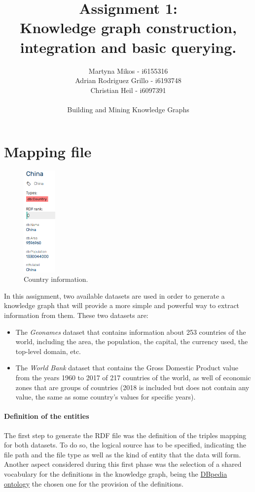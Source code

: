 \documentclass[11pt]{article}
\title{Assignment 1:\\ Knowledge graph construction, integration and basic querying.}
\author{Martyna Mikos - i6155316\\
Adrian Rodriguez Grillo - i6193748\\
Christian Heil - i6097391\\\\ Building and Mining Knowledge Graphs}
\begin{document}
\maketitle

\section{Mapping file}

\begin{figure}
  \centering
   \includegraphics[width=0.15\textwidth]{images/info_box.png}
  \caption{Country information.}
  \label{fig:country_info}
 \vspace{-10mm}
\end{figure}

In this assignment, two available datasets are used in order to generate a knowledge graph that will provide a more simple and powerful way to extract information from them. These two datasets are: 

\begin{itemize}
\item The \textit{Geonames} dataset that contains information about 253 countries of the world, including the area, the population, the capital, the currency used, the top-level domain, etc. 

\item The \textit{World Bank} dataset that contains the Gross Domestic Product value from the years 1960 to 2017 of 217 countries of the world, as well of economic zones that are groups of countries (2018 is included but does not contain any value, the same as some country's values for specific years). 
\end{itemize}

\paragraph{Definition of the entities}
The first step to generate the RDF file was the definition of the triples mapping for both datasets. To do so, the logical source has to be specified, indicating the file path and the file type as well as the kind of entity that the data will form. Another aspect considered during this first phase was the selection of a shared vocabulary for the definitions in the knowledge graph, being the  \href{http://mappings.dbpedia.org/server/ontology/classes/}{DBpedia ontology} the chosen one for the provision of the definitions.
\end{document}
